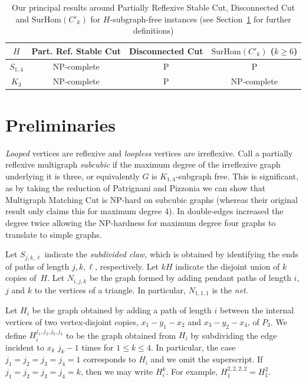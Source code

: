 \documentclass[a4paper,UKenglish,cleveref, autoref,thm-restate]{lipics-v2021}
\newcommand{\SurHom}{\ensuremath{\mathrm{SurHom}}}
\begin{document}
\begin{table}
\begin{center}
\begin{tabular}{|c|c|c|c|}
\hline
 $H$ & {\sc \mbox{Part.} \mbox{Ref.} Stable Cut} & {\sc Disconnected Cut} & $\SurHom(C'_k)$ ($k\geq 6$) \\
\hline  
 $S_{1,4}$ & NP-complete & P & P\\  
\hline
 $K_3$ & NP-complete & P & NP-complete \\    
\hline
\end{tabular}
\end{center}
\caption{Our principal results around {\sc Partially Reflexive Stable Cut}, {\sc Disconnected Cut} and $\SurHom(C'_k)$ for $H$-subgraph-free instances (see Section~\ref{s-pre} for further definitions)}
\label{tab:2}
\end{table}

\section{Preliminaries}\label{s-pre}

\emph{Looped} vertices are reflexive and \emph{loopless} vertices are irreflexive. Call a partially reflexive multigraph \emph{subcubic} if the maximum degree of the irreflexive graph underlying it is three, or equivalently $G$ is $K_{1,4}$-subgraph free. This is significant, as by taking the reduction of Patrignani and Pizzonia \cite{MatchingCut} we can show that {\sc Multigraph Matching Cut} is NP-hard on subcubic graphs (whereas their original result only claims this for maximum degree 4). In \cite{MatchingCut} double-edges increased the degree twice allowing the NP-hardness for maximum degree four graphs to translate to simple graphs.

Let $S_{j,k,\ell}$ indicate the {\it subdivided claw}, which is obtained by identifying the ends of paths of length $j,k,\ell$, respectively. Let $kH$ indicate the disjoint union of $k$ copies of~$H$.
Let $N_{i,j,k}$ be the graph formed by adding pendant paths of length $i$, $j$ and $k$ to the vertices of a triangle. In particular, $N_{1,1,1}$ is the {\it net}.

 Let ${H_{i}}$ be the graph obtained by adding a path of length $i$ between the internal vertices of two vertex-disjoint copies, $x_1-y_1-x_2$ and $x_3-y_2-x_4$, of $P_3$. We define ${H^{j_1, j_2, j_3, j_4}_{i}}$ to be the graph obtained from $H_i$ by subdividing the edge incident to $x_k$ $j_k-1$ times for $1 \leq k \leq 4$. In particular, the case $j_1=j_2=j_3=j_4=1$ corresponds to $H_i$ and we omit the superscript. If $j_1=j_2=j_3=j_4=k$, then we may write $H^k_i$. For example, $H^{2,2,2,2}_1=H^2_1$.
\end{document}
